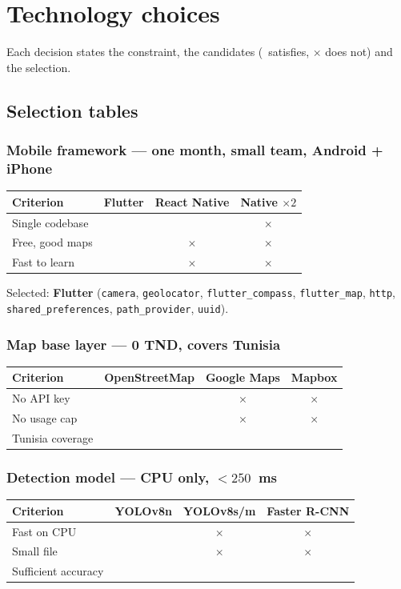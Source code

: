 \documentclass[11pt,a4paper,oneside]{report}
\begin{document}
\chapter{Technology choices}
Each decision states the constraint, the candidates (\checkmark\ satisfies, $\times$ does not) and the selection.
\newcommand{\yes}{\checkmark}
\newcommand{\no}{$\times$}

\section{Selection tables}
\subsection*{Mobile framework --- one month, small team, Android + iPhone}
\begin{tabular}{@{}lccc@{}}\toprule Criterion & \textbf{Flutter} & React Native & Native $\times2$\\\midrule
Single codebase & \yes & \yes & \no\\ Free, good maps & \yes & \no & \no\\ Fast to learn & \yes & \no & \no\\\bottomrule\end{tabular}

Selected: \textbf{Flutter} (\texttt{camera}, \texttt{geolocator}, \texttt{flutter\_compass}, \texttt{flutter\_map},
\texttt{http}, \texttt{shared\_preferences}, \texttt{path\_provider}, \texttt{uuid}).

\subsection*{Map base layer --- 0 TND, covers Tunisia}
\begin{tabular}{@{}lccc@{}}\toprule Criterion & \textbf{OpenStreetMap} & Google Maps & Mapbox\\\midrule
No API key & \yes & \no & \no\\ No usage cap & \yes & \no & \no\\ Tunisia coverage & \yes & \yes & \yes\\\bottomrule\end{tabular}

\subsection*{Detection model --- CPU only, $<250$~ms}
\begin{tabular}{@{}lccc@{}}\toprule Criterion & \textbf{YOLOv8n} & YOLOv8s/m & Faster R-CNN\\\midrule
Fast on CPU & \yes & \no & \no\\ Small file & \yes & \no & \no\\ Sufficient accuracy & \yes & \yes & \yes\\\bottomrule\end{tabular}
\end{document}
